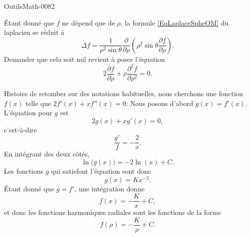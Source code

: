 
\begin{corrige}{OutilsMath-0082}

    Étant donné que $f$ ne dépend que de $\rho$, la formule \eqref{EqLaplaceSpheOM} du laplacien se réduit à
    \begin{equation}
        \Delta f=\frac{1}{ \rho^2\sin\theta }\frac{ \partial  }{ \partial \rho }\left( \rho^2\sin\theta\frac{ \partial f }{ \partial \rho } \right).
    \end{equation}
    Demander que cela soit nul revient à poser l'équation
    \begin{equation}
        2\frac{ \partial f }{ \partial \rho }+\rho\frac{ \partial^2f }{ \partial \rho^2 }=0.
    \end{equation}
    
    Histoire de retomber sur des notations habituelles, nous cherchons une fonction $f(x)$ telle que $2f'(x)+xf''(x)=0$. Nous posons d'abord $g(x)=f'(x)$. L'équation pour $g$ est
    \begin{equation}
        2g(x)+xg'(x)=0,
    \end{equation}
    c'est-à-dire
    \begin{equation}
        \frac{ g' }{ f }=-\frac{ 2 }{ x }.
    \end{equation}
    En intégrant des deux côtés,
    \begin{equation}
        \ln\big( g(x) \big)=-2\ln(x)+C.
    \end{equation}
    Les fonctions $g$ qui satisfont l'équation sont donc
    \begin{equation}
        g(x)=Kx^{-2}.
    \end{equation}
    Étant donné que $g=f'$, une intégration donne
    \begin{equation}
        f(x)=-\frac{ K }{ x }+C,
    \end{equation}
    et donc les fonctions harmoniques radiales sont les fonctions de la forme
    \begin{equation}
        f(\rho)=-\frac{ K }{ \rho }+C.
    \end{equation}

\end{corrige}
